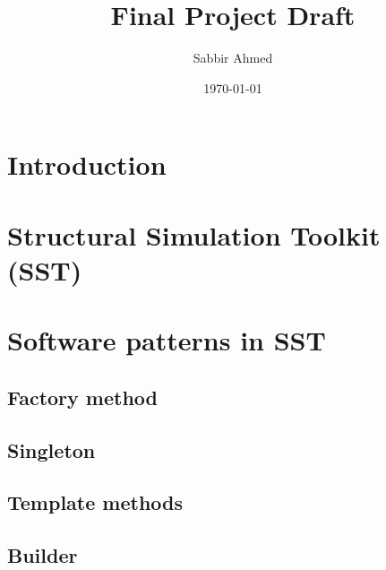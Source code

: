\documentclass{report}
\title{Final Project Draft}
\author{Sabbir Ahmed}
\date{\today}
\begin{document}
\maketitle

\section{Introduction}

\section{Structural Simulation Toolkit (SST)}

\section{Software patterns in SST}

\subsection{Factory method}

\subsection{Singleton}

\subsection{Template methods}

\subsection{Builder}
\end{document}
